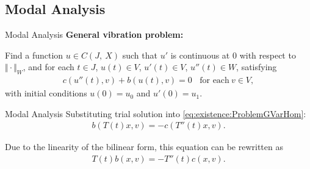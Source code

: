 \documentclass[8pt]{beamer}
\begin{document}
    \subsection{Modal Analysis}
        \begin{frame}{Modal Analysis}
            \textbf{General vibration problem:}
        
            Find a function $u \in C(J,\ X)$ such that $u'$ is continuous at $0$ with respect to $\Vert \cdot \Vert_{W}$, and for each $t \in J$, $u(t) \in V$, $u'(t) \in V$, $u''(t) \in W$, satisfying
            \begin{eqnarray}
                c(u''(t),v)+b(u(t),v) = 0 \ \ \ \ \textrm{for each} \ v \in V, \label{eq:existence:ProblemGVarHom}
            \end{eqnarray}
            with initial conditions $u(0) = u_0$ and $u'(0) = u_1$.
        
        \end{frame}
        
        \begin{frame}{Modal Analysis}
           Substituting trial solution into \eqref{eq:existence:ProblemGVarHom}:
           \begin{eqnarray*}
                b(T(t)x,v) = - c(T''(t)x,v).  \label{eq:existence:ProblemGVarHom:Substitution}
            \end{eqnarray*}
        
            Due to the linearity of the bilinear form, this equation can be rewritten as
            \begin{eqnarray*}
                T(t)b(x,v) = - T''(t)c(x,v).
            \end{eqnarray*}
        
        
        \end{frame}
        
\end{document}
